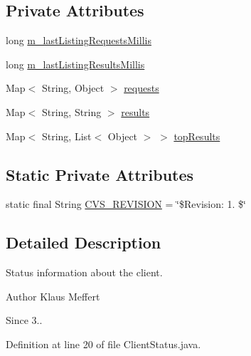 \subsection*{Private Attributes}
\begin{DoxyCompactItemize}
\item 
long \hyperlink{classorg_1_1jgap_1_1distr_1_1grid_1_1common_1_1_client_status_aebf08467549930ad382ab8b188ff83ac}{m\-\_\-last\-Listing\-Requests\-Millis}
\item 
long \hyperlink{classorg_1_1jgap_1_1distr_1_1grid_1_1common_1_1_client_status_ac9e68055b17c703a0945260eae356fac}{m\-\_\-last\-Listing\-Results\-Millis}
\item 
Map$<$ String, Object $>$ \hyperlink{classorg_1_1jgap_1_1distr_1_1grid_1_1common_1_1_client_status_a0afa5f4c9a0b5a684fb486e67858306b}{requests}
\item 
Map$<$ String, String $>$ \hyperlink{classorg_1_1jgap_1_1distr_1_1grid_1_1common_1_1_client_status_a2ca3e7f0916d416de51230724aaae46d}{results}
\item 
Map$<$ String, List$<$ Object $>$ $>$ \hyperlink{classorg_1_1jgap_1_1distr_1_1grid_1_1common_1_1_client_status_a2223b5599789c9241742767afb0317bd}{top\-Results}
\end{DoxyCompactItemize}
\subsection*{Static Private Attributes}
\begin{DoxyCompactItemize}
\item 
static final String \hyperlink{classorg_1_1jgap_1_1distr_1_1grid_1_1common_1_1_client_status_a16e28841b9a87e0f86501660dde29343}{C\-V\-S\-\_\-\-R\-E\-V\-I\-S\-I\-O\-N} = \char`\"{}\$Revision\-: 1. \$\char`\"{}
\end{DoxyCompactItemize}


\subsection{Detailed Description}
Status information about the client.

\begin{DoxyAuthor}{Author}
Klaus Meffert 
\end{DoxyAuthor}
\begin{DoxySince}{Since}
3.. 
\end{DoxySince}


Definition at line 20 of file Client\-Status.\-java.



